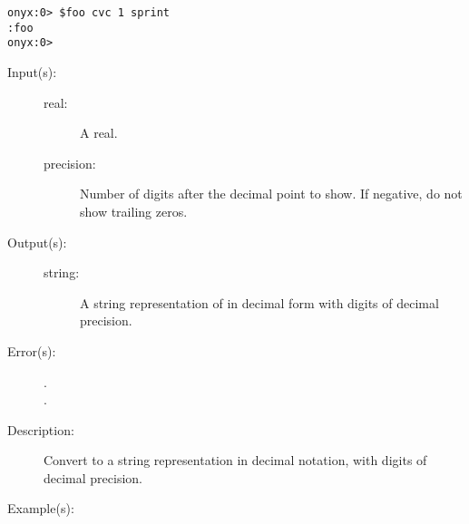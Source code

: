 \begin{description}
\begin{description}
\begin{verbatim}
onyx:0> $foo cvc 1 sprint
:foo
onyx:0>
		\end{verbatim}
	\end{description}
\label{systemdict:cvds}
\item[{\onyxop{real precision}{cvds}{string}}: ]
	\begin{description}\item[]
	\item[Input(s): ]
		\begin{description}\item[]
		\item[real: ]
			A real.
		\item[precision: ]
			Number of digits after the decimal point to show.  If
			negative, do not show trailing zeros.
		\end{description}
	\item[Output(s): ]
		\begin{description}\item[]
		\item[string: ]
			A string representation of  in decimal form
			with  digits of decimal precision.
		\end{description}
	\item[Error(s): ]
		\begin{description}\item[]
		\item[.]
		\item[.]
		\end{description}
	\item[Description: ]
		Convert  to a string representation in decimal
		notation, with  digits of decimal precision.
	\item[Example(s): ]\begin{verbatim}


\end{verbatim}
\end{description}
\end{description}
